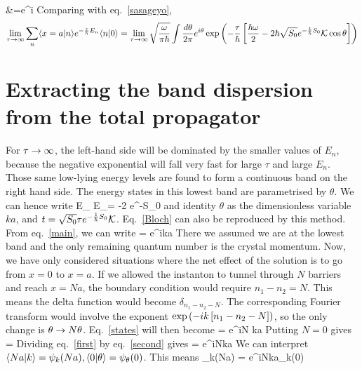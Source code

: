 \documentclass{article}
\begin{document}
					  &=\sqrt{\fr{ \omega  }{\pi \hbar }}\int {}e^{i\theta} 
\eeq
Comparing with eq.~\ref{sasageyo},
\begin{equation}\begin{aligned}
\label{main}
\lim_{\tau \to \infty}\sum_n \langle{x=a|n}\rangle e^{-\frac{\tau}{\hbar}E_n} \langle{n|0}\rangle = \lim_{\tau \to \infty}\sqrt{\frac{ \omega  }{\pi \hbar }}\int \frac{d\theta}{2\pi}e^{i\theta} \exp\left({-\frac{\tau}{\hbar}\left[{\frac{\hbar\omega}{2}-2\hbar\sqrt{S_0} e^{-\frac{1}{\hbar}S_0}\mathcal{K}\cos\theta}\right]}\right)\\
\end{aligned}\end{equation}
\section{Extracting the band dispersion from the total propagator}
For \(\tau \rightarrow \infty\), the left-hand side will be dominated by the smaller values of \(E_n\), because the negative exponential will fall very fast for large \(\tau\) and large \(E_n\). Those same low-lying energy levels are found to form a continuous band on the right hand side. The energy states in this lowest band are parametrised by \(\theta\). We can hence write
\beq
E_ \approx E_\theta = -2\hbar{} e^{-S_0}\cos\theta
\eeq
and identity \(\theta\) as the dimensionless variable \(ka\), and \(t = \sqrt{S_0} \tau e^{-\frac{1}{\hbar}S_0}\mathcal{K}\). Eq.~\ref{Bloch}  can also be reproduced by this method. From eq.~\ref{main}, we can write
\beq[states]
 = \sqrt{\fr{ \omega  }{\pi \hbar }}e^{ika}
\eeq
There we assumed we are at the lowest band and the only remaining quantum number is the crystal momentum. Now, we have only considered situations where the net effect of the solution is to go from \(x=0\) to \(x=a\). If we allowed the instanton to tunnel through \(N\) barriers and reach \(x=Na\), the boundary condition would require \(n_1 - n_2 = N\). This means the delta function would become \(\delta_{n_1 - n_2 - N}\). The corresponding Fourier transform would involve the exponent \(\exp\left({-ik\left[{n_1 - n_2 - N}\right]}\right)\), so the only change is  \(\theta \rightarrow N\theta\). Eq.~\ref{states} will then become
\beq[first]
 = \sqrt{\fr{ \omega  }{\pi \hbar }}e^{iN ka}
\eeq
Putting \(N=0\) gives
\beq[second]
 = \sqrt{\fr{ \omega  }{\pi \hbar }}
\eeq
Dividing eq.~\ref{first} by eq.~\ref{second} gives
\beq
{}= e^{iNka}
\eeq
We can interpret \(\langle{Na|k}\rangle = \psi_k(Na), \langle{0|\theta}\rangle = \psi_\theta(0)\). This means
\beq[guren]
\psi_k(Na) = e^{iNka}\psi_k(0)
\eeq
\end{document}
